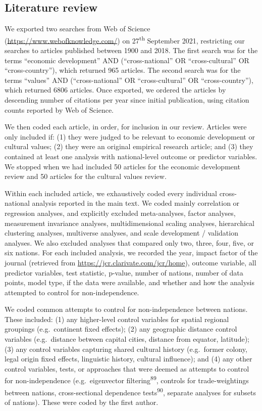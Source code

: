 \documentclass[
  man,floatsintext]{apa6}
\begin{document}
\hypertarget{literature-review}{%
\subsection{Literature review}\label{literature-review}}

We exported two searches from Web of Science (\url{https://www.webofknowledge.com/}) on 27\textsuperscript{th} September 2021, restricting our searches to articles published between 1900 and 2018. The first search was for the terms ``economic development'' AND (``cross-national'' OR ``cross-cultural'' OR ``cross-country''), which returned 965 articles. The second search was for the terms ``values'' AND (``cross-national'' OR ``cross-cultural'' OR ``cross-country''), which returned 6806 articles. Once exported, we ordered the articles by descending number of citations per year since initial publication, using citation counts reported by Web of Science.

We then coded each article, in order, for inclusion in our review. Articles were only included if: (1) they were judged to be relevant to economic development or cultural values; (2) they were an original empirical research article; and (3) they contained at least one analysis with national-level outcome or predictor variables. We stopped when we had included 50 articles for the economic development review and 50 articles for the cultural values review.

Within each included article, we exhaustively coded every individual cross-national analysis reported in the main text. We coded mainly correlation or regression analyses, and explicitly excluded meta-analyses, factor analyses, measurement invariance analyses, multidimensional scaling analyses, hierarchical clustering analyses, multiverse analyses, and scale development / validation analyses. We also excluded analyses that compared only two, three, four, five, or six nations. For each included analysis, we recorded the year, impact factor of the journal (retrieved from \url{https://jcr.clarivate.com/jcr/home}), outcome variable, all predictor variables, test statistic, p-value, number of nations, number of data points, model type, if the data were available, and whether and how the analysis attempted to control for non-independence.

We coded common attempts to control for non-independence between nations. These included: (1) any higher-level control variables for spatial regional groupings (e.g.~continent fixed effects); (2) any geographic distance control variables (e.g.~distance between capital cities, distance from equator, latitude); (3) any control variables capturing shared cultural history (e.g.~former colony, legal origin fixed effects, linguistic history, cultural influence); and (4) any other control variables, tests, or approaches that were deemed as attempts to control for non-independence (e.g.~eigenvector filtering\textsuperscript{89}, controls for trade-weightings between nations, cross-sectional dependence tests\textsuperscript{90}, separate analyses for subsets of nations). These were coded by the first author.
\end{document}
